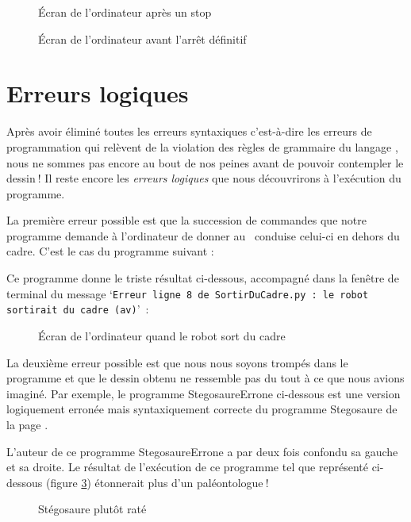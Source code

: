 \begin{figure}[p] %
 \caption{Écran de l'or\-di\-na\-teur après un stop}\label{fig:ecran-stop}
\end{figure}

\begin{figure}[p] %
 \caption{Écran de l'or\-di\-na\-teur avant l'arrêt définitif}
 \label{fig:ecran-arret}
\end{figure}

\clearpage
\section{Erreurs logiques} 

Après avoir éliminé toutes les erreurs syntaxiques c'est-à-dire 
les erreurs de programmation qui relèvent de la violation des règles de grammaire 
du langage \python, nous ne sommes pas encore au bout de nos peines avant de pouvoir
contempler le \hbox{dessin$\:$!} Il reste encore les
{\em erreurs logiques}
que nous découvrirons à l'exécution du programme.

La première erreur possible est que la succession de commandes que notre
programme demande à l'or\-di\-na\-teur de donner au \robot\ conduise celui-ci
en dehors du cadre. C'est le cas du programme suivant :

\noindent Ce programme donne le triste résultat 
ci-dessous, accompagné dans la fenêtre de terminal du message 
`{\tt Erreur ligne 8 de SortirDuCadre.py : le robot sortirait du cadre (av)}'~:
\begin{figure}[htbp]
 \caption{Écran de l'or\-di\-na\-teur quand le robot sort du cadre}
\end{figure}

La deuxième erreur possible est que nous nous soyons trompés dans
le programme et que le dessin obtenu ne ressemble pas du tout à ce
que nous avions imaginé. Par exemple, le programme {\idt StegosaureErrone}
ci-dessous est une version logiquement erronée mais syntaxiquement 
correcte du programme {\idt Stegosaure} de la page \pageref{prog:Stegosaure}. 

L'auteur de ce programme {\idt StegosaureErrone} a par deux fois confondu sa gauche 
et sa droite. Le 
résultat de l'exécution de ce programme tel
que représenté
ci-dessous
(figure \ref{fig:StegosaureErrone}) %
éton\-ne\-rait plus d'un pa\-lé\-on\-to\-lo\-gue$\:$!
\begin{figure}[htbp]
 \caption{Stégosaure plutôt raté}
 \label{fig:StegosaureErrone}
\end{figure}

